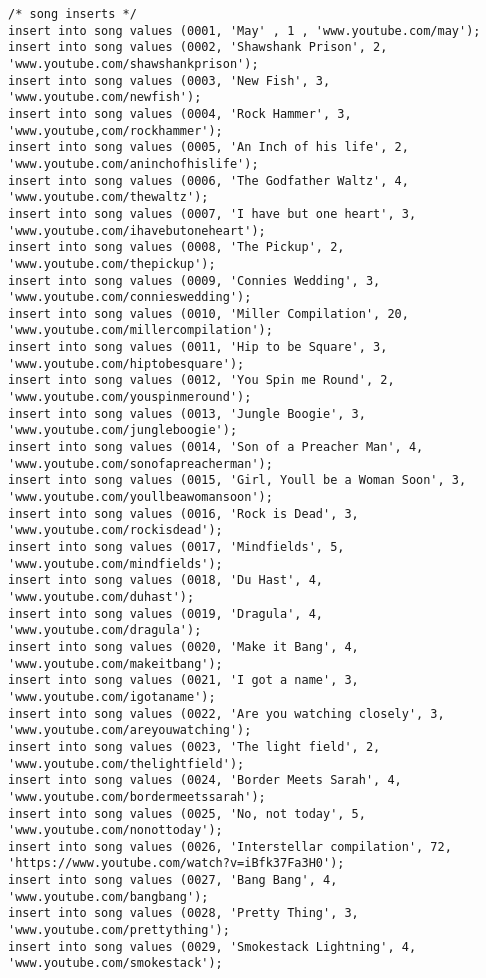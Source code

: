 \documentclass[12pt]{article}
\begin{document}
\begin{lstlisting}
/* song inserts */
insert into song values (0001, 'May' , 1 , 'www.youtube.com/may');
insert into song values (0002, 'Shawshank Prison', 2, 'www.youtube.com/shawshankprison');
insert into song values (0003, 'New Fish', 3, 'www.youtube.com/newfish');
insert into song values (0004, 'Rock Hammer', 3, 'www.youtube,com/rockhammer');
insert into song values (0005, 'An Inch of his life', 2, 'www.youtube.com/aninchofhislife');
insert into song values (0006, 'The Godfather Waltz', 4, 'www.youtube.com/thewaltz');
insert into song values (0007, 'I have but one heart', 3, 'www.youtube.com/ihavebutoneheart');
insert into song values (0008, 'The Pickup', 2, 'www.youtube.com/thepickup');
insert into song values (0009, 'Connies Wedding', 3, 'www.youtube.com/connieswedding');
insert into song values (0010, 'Miller Compilation', 20, 'www.youtube.com/millercompilation');
insert into song values (0011, 'Hip to be Square', 3, 'www.youtube.com/hiptobesquare');
insert into song values (0012, 'You Spin me Round', 2, 'www.youtube.com/youspinmeround');
insert into song values (0013, 'Jungle Boogie', 3, 'www.youtube.com/jungleboogie');
insert into song values (0014, 'Son of a Preacher Man', 4, 'www.youtube.com/sonofapreacherman');
insert into song values (0015, 'Girl, Youll be a Woman Soon', 3, 'www.youtube.com/youllbeawomansoon');
insert into song values (0016, 'Rock is Dead', 3, 'www.youtube.com/rockisdead');
insert into song values (0017, 'Mindfields', 5, 'www.youtube.com/mindfields');
insert into song values (0018, 'Du Hast', 4, 'www.youtube.com/duhast');
insert into song values (0019, 'Dragula', 4, 'www.youtube.com/dragula');
insert into song values (0020, 'Make it Bang', 4, 'www.youtube.com/makeitbang');
insert into song values (0021, 'I got a name', 3, 'www.youtube.com/igotaname');
insert into song values (0022, 'Are you watching closely', 3, 'www.youtube.com/areyouwatching');
insert into song values (0023, 'The light field', 2, 'www.youtube.com/thelightfield');
insert into song values (0024, 'Border Meets Sarah', 4, 'www.youtube.com/bordermeetssarah');
insert into song values (0025, 'No, not today', 5, 'www.youtube.com/nonottoday');
insert into song values (0026, 'Interstellar compilation', 72, 'https://www.youtube.com/watch?v=iBfk37Fa3H0');
insert into song values (0027, 'Bang Bang', 4, 'www.youtube.com/bangbang');
insert into song values (0028, 'Pretty Thing', 3, 'www.youtube.com/prettything');
insert into song values (0029, 'Smokestack Lightning', 4, 'www.youtube.com/smokestack');



\end{lstlisting}
\end{document}
